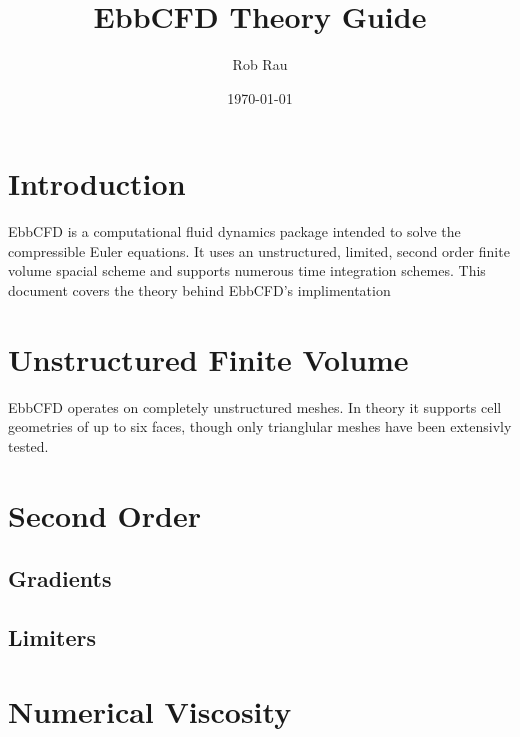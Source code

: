 \documentclass[12pt,parskip=full]{article}
\numberwithin{subsection}{section}
\begin{document}
	\vspace{-4ex}
	\title{EbbCFD Theory Guide\vspace{-3.5ex}}
	\author{Rob Rau\vspace{-4ex}}
	\date{\today\vspace{-4ex}}
	\maketitle

	\section{Introduction}
		EbbCFD is a computational fluid dynamics package intended to solve the compressible Euler equations.
		It uses an unstructured, limited, second order finite volume spacial scheme and supports numerous
		time integration schemes. This document covers the theory behind EbbCFD's implimentation

	\section{Unstructured Finite Volume}
		EbbCFD operates on completely unstructured meshes. In theory it supports cell geometries of up to six faces,
		though only trianglular meshes have been extensivly tested. 
		
	\section{Second Order}
		\subsection{Gradients}
		\subsection{Limiters}
	
	\section{Numerical Viscosity}
\end{document}
